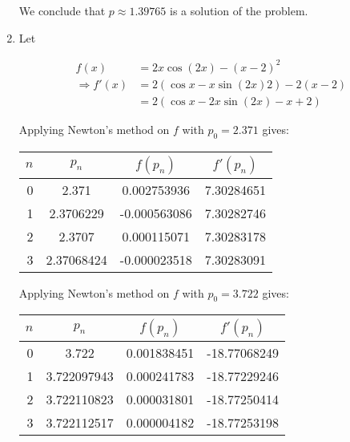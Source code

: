 \documentclass[../../../../Assignments]{subfiles}
\begin{document}
\begin{solution}
\begin{enumerate}[label = \alph*)]
            We conclude that \(p \approx \num{1.39765}\) is a solution of the
            problem.

        \item Let

            \begin{align*}
                             f(x) &= 2 x \cos(2x) - (x - 2)^2 \\
                \Rightarrow f'(x) &= 2(\cos{x} - x \sin(2x) 2) - 2(x - 2) \\
                                  &= 2(\cos{x} - 2 x \sin(2x) - x + 2)
            \end{align*}

            Applying Newton's method on \(f\) with \(p_0 = \num{2.371}\) gives:

            \begin{table}[H]
                \centering
                \begin{tabular}{r S[table-format=1.9] S[table-format=-1.9] S[table-format=1.9]}
                    \toprule
                    \(n\)  &   {\(p_n\)}   &   {\(f(p_n)\)}  &  {\(f'(p_n)\)}  \\
                      &  2.371        &   0.002753936  &  7.30284651      \\
                        1  &  2.3706229    &  -0.000563086  &  7.30282746      \\
                        2  &  2.3707       &   0.000115071  &  7.30283178      \\
                        3  &  2.37068424   &  -0.000023518  &  7.30283091      \\
                    \bottomrule
                \end{tabular}
            \end{table}

            Applying Newton's method on \(f\) with \(p_0 = \num{3.722}\) gives:

            \begin{table}[H]
                \centering
                \begin{tabular}{r S[table-format=1.9] S[table-format=1.9] S[table-format=-2.8]}
                    \toprule
                    \(n\)  &   {\(p_n\)}   &  {\(f(p_n)\)}  &  {\(f'(p_n)\)}  \\
                      &  3.722        &  0.001838451   &  -18.77068249   \\
                        1  &  3.722097943  &  0.000241783   &  -18.77229246   \\
                        2  &  3.722110823  &  0.000031801   &  -18.77250414   \\
                        3  &  3.722112517  &  0.000004182   &  -18.77253198   \\
                    \bottomrule
                \end{tabular}
            \end{table}


\end{enumerate}
\end{solution}
\end{document}
